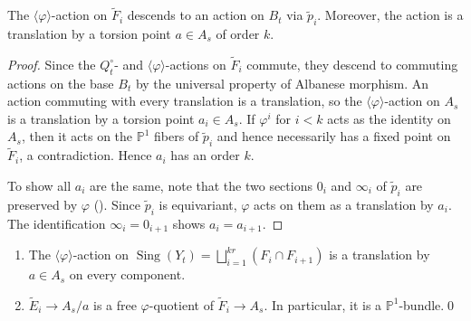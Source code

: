 \documentclass[reqno, letterpaper]{amsart}
\numberwithin{equation}{subsection}
\let\to\longrightarrow
\newcommand{\PP}{\mathbb{P}}
\DeclareMathOperator{\Sing}{Sing}
\begin{document}
			\begin{lemma} \label{lem:classification of multiple fiber iii:varphi-action on Albanese}
				The $\langle \varphi \rangle$-action on $\tilde F_i$ descends to an action on $B_t$ via $\tilde p_i$. Moreover, the action is a translation by a torsion point $a \in A_s$ of order $k$.
			\end{lemma}
			\begin{proof}
				Since the $Q_t^\circ$- and $\langle \varphi \rangle$-actions on $\tilde F_i$ commute, they descend to commuting actions on the base $B_t$ by the universal property of Albanese morphism. An action commuting with every translation is a translation, so the $\langle \varphi \rangle$-action on $A_s$ is a translation by a torsion point $a_i \in A_s$. If $\varphi^i$ for $i < k$ acts as the identity on $A_s$, then it acts on the $\PP^1$ fibers of $\tilde p_i$ and hence necessarily has a fixed point on $\tilde F_i$, a contradiction. Hence $a_i$ has an order $k$.
				
				To show all $a_i$ are the same, note that the two sections $0_i$ and $\infty_i$ of $\tilde p_i$ are preserved by $\varphi$ (). Since $\tilde p_i$ is equivariant, $\varphi$ acts on them as a translation by $a_i$. The identification $\infty_i = 0_{i+1}$ shows $a_i = a_{i+1}$.
			\end{proof}
			
			\begin{corollary} \label{cor:classification of multiple fiber iii:varphi-action on Sing}
				\begin{enumerate}
					\item The $\langle \varphi \rangle$-action on $\Sing(Y_t) = \bigsqcup_{i=1}^{kr} (F_i \cap F_{i+1})$ is a translation by $a \in A_s$ on every component.
					\item $\tilde E_i \to A_s/a$ is a free $\varphi$-quotient of $\tilde F_i \to A_s$. In particular, it is a $\PP^1$-bundle.\qed
				\end{enumerate}
			\end{corollary}
			
\end{document}
